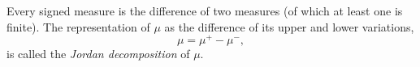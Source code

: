 Every signed measure is the difference of two measures (of which at least one is finite). The representation of $\mu$ as the difference of its upper and lower variations,
$$\mu = \mu^{+} - \mu^{-},$$
is called the \textit{Jordan decomposition} of $\mu$.
